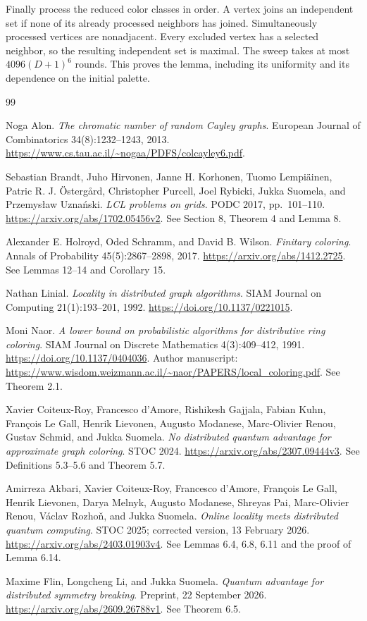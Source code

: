\documentclass[11pt]{article}
\theoremstyle{definition}\newtheorem{definition}[theorem]{Definition}
\theoremstyle{remark}\newtheorem{remark}[theorem]{Remark}
\begin{document}
Finally process the reduced color classes in order. A vertex
joins an independent set if none of its already processed
neighbors has joined. Simultaneously processed vertices are
nonadjacent. Every excluded vertex has a selected neighbor,
so the resulting independent set is maximal. The sweep takes
at most $4096(D+1)^6$ rounds. This proves the lemma, including
its uniformity and its dependence on the initial palette.

\begin{thebibliography}{99}

Noga Alon.
\emph{The chromatic number of random Cayley graphs}.
European Journal of Combinatorics 34(8):1232--1243, 2013.
\url{https://www.cs.tau.ac.il/~nogaa/PDFS/colcayley6.pdf}.

Sebastian Brandt, Juho Hirvonen, Janne H. Korhonen,
Tuomo Lempi\"ainen, Patric R. J. \"Osterg\aa rd,
Christopher Purcell, Joel Rybicki, Jukka Suomela,
and Przemys\l aw Uzna\'nski.
\emph{LCL problems on grids}.
PODC 2017, pp.\ 101--110.
\url{https://arxiv.org/abs/1702.05456v2}.
See Section 8, Theorem 4 and Lemma 8.

Alexander E. Holroyd, Oded Schramm, and David B. Wilson.
\emph{Finitary coloring}.
Annals of Probability 45(5):2867--2898, 2017.
\url{https://arxiv.org/abs/1412.2725}.
See Lemmas 12--14 and Corollary 15.

Nathan Linial.
\emph{Locality in distributed graph algorithms}.
SIAM Journal on Computing 21(1):193--201, 1992.
\url{https://doi.org/10.1137/0221015}.

Moni Naor.
\emph{A lower bound on probabilistic algorithms for distributive ring coloring}.
SIAM Journal on Discrete Mathematics 4(3):409--412, 1991.
\url{https://doi.org/10.1137/0404036}.
Author manuscript:
\url{https://www.wisdom.weizmann.ac.il/~naor/PAPERS/local_coloring.pdf}.
See Theorem 2.1.

Xavier Coiteux-Roy, Francesco d'Amore, Rishikesh Gajjala,
Fabian Kuhn, Fran\c{c}ois Le Gall, Henrik Lievonen,
Augusto Modanese, Marc-Olivier Renou, Gustav Schmid,
and Jukka Suomela.
\emph{No distributed quantum advantage for approximate graph coloring}.
STOC 2024.
\url{https://arxiv.org/abs/2307.09444v3}.
See Definitions 5.3--5.6 and Theorem 5.7.

Amirreza Akbari, Xavier Coiteux-Roy, Francesco d'Amore,
Fran\c{c}ois Le Gall, Henrik Lievonen, Darya Melnyk,
Augusto Modanese, Shreyas Pai, Marc-Olivier Renou,
V\'aclav Rozho\v{n}, and Jukka Suomela.
\emph{Online locality meets distributed quantum computing}.
STOC 2025; corrected version, 13 February 2026.
\url{https://arxiv.org/abs/2403.01903v4}.
See Lemmas 6.4, 6.8, 6.11 and the proof of Lemma 6.14.

Maxime Flin, Longcheng Li, and Jukka Suomela.
\emph{Quantum advantage for distributed symmetry breaking}.
Preprint, 22 September 2026.
\url{https://arxiv.org/abs/2609.26788v1}.
See Theorem 6.5.

\end{thebibliography}
\end{document}
